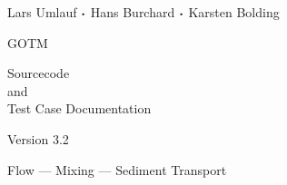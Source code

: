 \documentclass[a4paper,twoside]{article}
\begin{document}
\begin{titlepage}


{\sf \bf \LARGE
 \begin{center}
   Lars Umlauf ${\boldsymbol \cdot}$ Hans Burchard ${\boldsymbol \cdot}$ Karsten Bolding
 \end{center}
}

\vspace{14mm}

{\sf \bf \Huge
 \begin{center}
   GOTM
 \end{center}
}

\vspace{6mm}

{\sf \bf \LARGE
 \begin{center}
   Sourcecode \\
      and \\
Test Case Documentation
 \end{center}
}


\vspace{5mm}

{\sf \bf \Large
 \begin{center}
  Version 3.2
 \end{center}
}

\vspace{8mm}

\begin{figure}[!h]
  \begin{center}
  \end{center}
\end{figure}

\vspace{7mm}

{\sf \bf \Large
 \begin{center}
  Flow ---  Mixing --- Sediment Transport
\end{center}
}


\end{titlepage}


\tableofcontents


























%

%

\cleardoublepage






\end{document}
